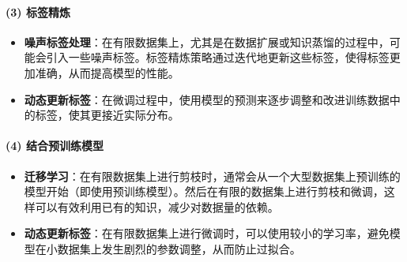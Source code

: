 \documentclass[twocolumn, 10pt]{article} %
\begin{document}
\paragraph{(3) 标签精炼} 
\begin{itemize}[left=2em] %
    \item \textbf{噪声标签处理}：在有限数据集上，尤其是在数据扩展或知识蒸馏的过程中，可能会引入一些噪声标签。标签精炼策略通过迭代地更新这些标签，使得标签更加准确，从而提高模型的性能。
    \item \textbf{动态更新标签}：在微调过程中，使用模型的预测来逐步调整和改进训练数据中的标签，使其更接近实际分布。
\end{itemize}

 \paragraph{(4) 结合预训练模型} 
\begin{itemize}[left=2em] %
    \item \textbf{迁移学习}：在有限数据集上进行剪枝时，通常会从一个大型数据集上预训练的模型开始（即使用预训练模型）。然后在有限的数据集上进行剪枝和微调，这样可以有效利用已有的知识，减少对数据量的依赖。
    \item \textbf{动态更新标签}：在有限数据集上进行微调时，可以使用较小的学习率，避免模型在小数据集上发生剧烈的参数调整，从而防止过拟合。
\end{itemize}
\end{document}
